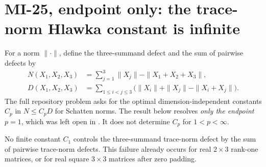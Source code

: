 \section{MI-25, endpoint only: the trace-norm Hlawka constant is infinite}
\label{sec:mi25}

For a norm $\|\cdot\|$, define the three-summand defect and the sum of pairwise defects by
\begin{align*}
 N(X_1,X_2,X_3)&=\sum_{j=1}^3\|X_j\|-\|X_1+X_2+X_3\|,\\
 D(X_1,X_2,X_3)&=\sum_{1\leq i<j\leq3}
 \bigl(\|X_i\|+\|X_j\|-\|X_i+X_j\|\bigr).
\end{align*}
The full repository problem asks for the optimal dimension-independent constants $C_p$ in $N\leq C_pD$ for Schatten norms. The result below resolves \emph{only the endpoint $p=1$}, which was left open in \cite[Problem 7]{AK2012}. It does not determine $C_p$ for $1<p<\infty$.

\begin{theorem}\label{thm:mi25}
No finite constant $C_1$ controls the three-summand trace-norm defect by the sum of pairwise trace-norm defects. This failure already occurs for real $2\times3$ rank-one matrices, or for real square $3\times3$ matrices after zero padding.
\end{theorem}

